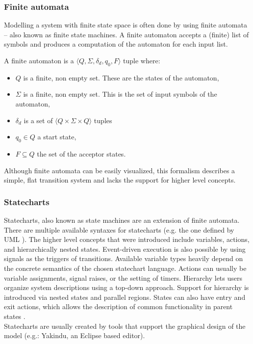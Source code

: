     \subsubsection{Finite automata}
Modelling a system with finite state space is often done by using finite automata -- also known as finite state machines. A finite automaton accepts a (finite) list of symbols and produces a computation of the automaton for each input list.
      \begin{dfn}
        \label{dfn:fa}
A finite automaton is a $\langle Q,\Sigma,\delta_d,q_0, F \rangle$ tuple where:
        \begin{itemize}
          \item $Q$ is a finite, non empty set. These are the states of the automaton,
          \item $\Sigma$ is a finite, non empty set. This is the set of input symbols of the automaton,
          \item $\delta_d$ is a set of $\langle Q \times \Sigma \times Q \rangle$ tuples
          \item $q_0 \in Q$ a start state,
          \item $F \subseteq Q$ the set of the acceptor states.
        \end{itemize}
      \end{dfn}
Although finite automata can be easily visualized, this formalism describes a simple, flat transition system and lacks the support for higher level concepts.
    \subsubsection{Statecharts}
Statecharts, also known as state machines are an extension of finite automata. There are multiple available syntaxes for statecharts (e.g. the one defined by UML \cite{stcuml}). The higher level concepts that were introduced include variables, actions, and hierarchically nested states. Event-driven execution is also possible by using signals as the triggers of transitions. Available variable types heavily depend on the concrete semantics of the chosen statechart language. Actions can usually be variable assignments, signal raises, or the setting of timers. Hierarchy lets users organize system descriptions using a top-down approach. Support for hierarchy is introduced via nested states and parallel regions. States can also have entry and exit actions, which allows the description of common functionality in parent states \cite{stcmove}.\\
Statecharts are usually created by tools that support the graphical design of the model (e.g.: Yakindu, an Eclipse based editor).
